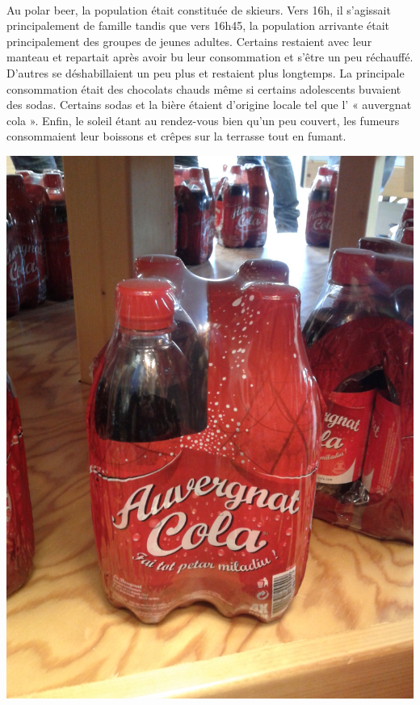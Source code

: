 \paragraph{}
Au polar beer, la population était constituée de skieurs. Vers 16h, il s’agissait principalement de famille tandis que vers 16h45, la population arrivante était principalement des groupes de jeunes adultes. Certains restaient avec leur manteau et repartait après avoir bu leur consommation et s’être un peu réchauffé. D’autres se déshabillaient un peu plus et restaient plus longtemps. La principale consommation était des chocolats chauds même si certains adolescents buvaient des sodas.  Certains sodas et la bière étaient d’origine locale tel que l’ « auvergnat cola ». Enfin, le soleil étant au rendez-vous bien qu’un peu couvert, les fumeurs consommaient leur boissons et crêpes sur la terrasse tout en fumant.
\begin{center}
\includegraphics[scale=0.15,angle=270]{AuvergnatCola.jpg}
\end{center}

